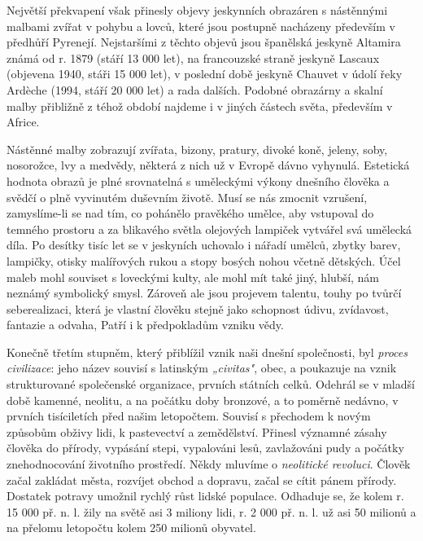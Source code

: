         Největší překvapení však přinesly objevy jeskynních obrazáren s nástěnnými malbami zvířat v
        pohybu a lovců, které jsou postupně nacházeny především v předhůří Pyrenejí. Nejstaršími z
        těchto objevů jsou španělská jeskyně Altamira známá od r. 1879 (stáří 13 000 let), na
        francouzské straně jeskyně Lascaux (objevena 1940, stáři 15 000 let), v poslední době
        jeskyně Chauvet v údolí řeky Ardèche (1994, stáří 20 000 let) a rada dalších. Podobné
        obrazárny a skalní malby přibližně z téhož období najdeme i v jiných částech světa,
        především v Africe.

        Nástěnné malby zobrazují zvířata, bizony, pratury, divoké koně, jeleny, soby, nosorožce, lvy
        a medvědy, některá z nich už v Evropě dávno vyhynulá. Estetická hodnota obrazů je plné
        srovnatelná s uměleckými výkony dnešního člověka a svědčí o plně vyvinutém duševním životě.
        Musí se nás zmocnit vzrušení, zamyslíme-li se nad tím, co pohánělo pravěkého umělce, aby
        vstupoval do temného prostoru a za blikavého světla olejových lampiček vytvářel svá umělecká
        díla. Po desítky tisíc let se v jeskyních uchovalo i nářadí umělců, zbytky barev, lampičky,
        otisky malířových rukou a stopy bosých nohou včetně dětských. Účel maleb mohl souviset s
        loveckými kulty, ale mohl mít také jiný, hlubší, nám neznámý symbolický smysl. Zároveň ale
        jsou projevem talentu, touhy po tvůrčí seberealizaci, která je vlastní člověku stejně jako
        schopnost údivu, zvídavost, fantazie a odvaha, Patří i k předpokladům vzniku vědy.

        Konečně třetím stupněm, který přiblížil vznik naši dnešní společnosti, byl \emph{proces
        civilizace}: jeho název souvisí s latinským \emph{„civitas"}, obec, a poukazuje na vznik
        strukturované společenské organizace, prvních státních celků. Odehrál se v mladší době
        kamenné, neolitu, a na počátku doby bronzové, a to poměrně nedávno, v prvních tisíciletích
        před našim letopočtem. Souvisí s přechodem k novým způsobům obživy lidi, k pastevectví a
        zemědělství. Přinesl významné zásahy člověka do přírody, vypásání stepi, vypalováni lesů,
        zavlažováni pudy a počátky znehodnocování životního prostředí. Někdy mluvíme o
        \emph{neolitické revoluci}. Člověk začal zakládat města, rozvíjet obchod a dopravu, začal se
        cítit pánem přírody. Dostatek potravy umožnil rychlý růst lidské populace. Odhaduje se, že
        kolem r. 15 000 př. n. l. žily na světě asi 3 miliony lidi, r. 2 000 př. n. l. už asi 50
        milionů a na přelomu letopočtu kolem 250 milionů obyvatel.


